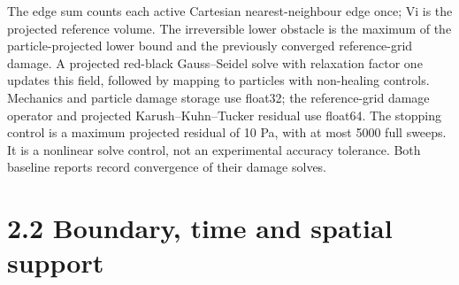 \documentclass[11pt]{article}
\begin{document}
The edge sum counts each active Cartesian nearest-neighbour edge once; Vi is the projected reference
volume. The irreversible lower obstacle is the maximum of the particle-projected lower bound
and the previously converged reference-grid damage. A projected red-black Gauss–Seidel solve
with relaxation factor one updates this field, followed by mapping to particles with non-healing
controls. Mechanics and particle damage storage use float32; the reference-grid damage operator
and projected Karush–Kuhn–Tucker residual use float64. The stopping control is a maximum
projected residual of 10 Pa, with at most 5000 full sweeps. It is a nonlinear solve control, not an
experimental accuracy tolerance. Both baseline reports record convergence of their damage solves.

\section*{2.2 Boundary, time and spatial support}
\end{document}
